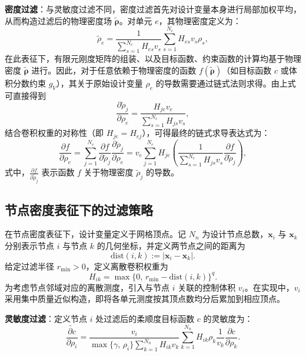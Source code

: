 \textbf{密度过滤}：与灵敏度过滤不同，密度过滤首先对设计变量本身进行局部加权平均，从而构造过滤后的物理密度场 $\tilde{\boldsymbol{\rho}}$。对单元 $e$，其物理密度定义为：
\begin{equation} \label{eq:ch3_cell_dens_filter}
	\tilde{\rho}_e = \frac{1}{\sum_{s=1}^{N_c} H_{es}v_s}\sum_{s=1}^{N_c} H_{es}v_s \rho_s,
\end{equation}
在此表征下，有限元刚度矩阵的组装、以及目标函数、约束函数的计算均基于物理密度 $\tilde{\boldsymbol{\rho}}$ 进行。因此，对于任意依赖于物理密度的函数 $f(\tilde{\boldsymbol{\rho}})$（如目标函数 $c$ 或体积分数约束 $g_V$），其关于原始设计变量 $\rho_e$ 的导数需要通过链式法则求得。由上式可直接得到
\[
\frac{\partial \tilde{\rho}_j}{\partial \rho_e} = \frac{H_{je} v_e}{\sum_{s=1}^{N_c} H_{js} v_s},
\]
结合卷积权重的对称性（即 $H_{je} = H_{ej}$），可得最终的链式求导表达式为：
\begin{equation} \label{eq:ch3_cell_chain_rule}
	\frac{\partial{f}}{\partial\rho_e} = \sum_{j=1}^{N_c} \frac{\partial{f}}{\partial \tilde{\rho}_j} \frac{\partial \tilde{\rho}_j}{\partial \rho_e} = v_e\sum_{j=1}^{N_c}H_{je}\left( \frac{1}{\sum_{s=1}^{N_c} H_{js} v_s}\frac{\partial{f}}{\partial \tilde{\rho}_j}\right),
\end{equation}
式中，$\frac{\partial f}{\partial \tilde{\rho}_j}$ 表示函数 $f$ 关于物理密度 $\tilde{\rho}_j$ 的导数。


\subsection{节点密度表征下的过滤策略}
\label{subsec:node_density_regularization}

在节点密度表征下，设计变量定义于网格顶点。记 $N_n$ 为设计节点总数，$\boldsymbol{x}_i$ 与 $\boldsymbol{x}_k$ 分别表示节点 $i$ 与节点 $k$ 的几何坐标，并定义两节点之间的距离为
\[
\mathrm{dist}(i,k):=\vert \boldsymbol{x}_i-\boldsymbol{x}_k\vert.
\]
给定过滤半径 $r_{\min}>0$，定义离散卷积权重为
\[
H_{ik}=\max\{0,\,r_{\min}-\mathrm{dist}(i,k)\}^q.
\]
为考虑节点邻域对应的离散测度，引入与节点 $i$ 关联的控制体积 $v_i$。在实现中，$v_i$ 采用集中质量近似构造，即将各单元测度按其顶点数均分后累加到相应顶点。

\textbf{灵敏度过滤}：定义节点 $i$ 处过滤后的柔顺度目标函数 $c$ 的灵敏度为：
\begin{equation} \label{eq:ch3_node_sens_filter}
	\widetilde{\frac{\partial c}{\partial\rho_i}} = \frac{v_i}{\max\{\gamma,\,
		\rho_i\}\sum_{k=1}^{N_n}H_{ik}v_k} \sum_{k=1}^{N_n}H_{ik}\rho_k\frac{1}{v_k}\frac{\partial c}{\partial\rho_k}.
\end{equation}

